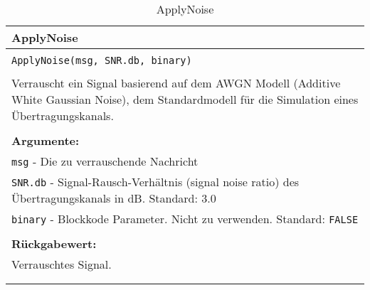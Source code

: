 \begin{longtable}{|p{\textwidth}|}
\hline
\rowcolor{lightblue}
ApplyNoise
\\
\hline
\\
\texttt{ApplyNoise(msg, SNR.db, binary)}\\
\\
Verrauscht ein Signal basierend auf dem AWGN Modell (Additive White Gaussian Noise), dem Standardmodell für die Simulation eines Übertragungskanals.\\
\\
\textbf{Argumente:}\\
\texttt{msg} - Die zu verrauschende Nachricht\\
\texttt{SNR.db} - Signal-Rausch-Verhältnis (signal noise ratio) des Übertragungskanals in dB. Standard: 3.0\\
\texttt{binary} - Blockkode Parameter. Nicht zu verwenden. Standard: \texttt{FALSE}\\
\\
\textbf{Rückgabewert:}\\
Verrauschtes Signal.\\
\\
\hline
\caption{ApplyNoise}
\label{funktion:ApplyNoise}
\end{longtable}